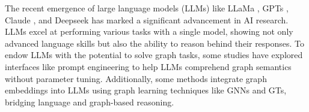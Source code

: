 The recent emergence of large language models (LLMs) like LLaMa \cite{touvron2023llama}, GPTs \cite{achiam2023gpt4}, Claude \cite{claude}, and Deepseek \cite{liu2024deepseek} has marked a significant advancement in AI research. LLMs excel at performing various tasks with a single model, showing not only advanced language skills but also the ability to reason behind their responses. To endow LLMs with the potential to solve graph tasks, some studies \cite{dai2024revisiting, zhang2024llm4dyg, kim2023kg, jiang2023structgpt, nlgraph, fatemi2023talk} have explored interfaces like prompt engineering to help LLMs comprehend graph semantics without parameter tuning. Additionally, some methods \cite{chen2024llaga, chai2023graphllm, tang2024graphgpt, perozzi2024let} integrate graph embeddings into LLMs using graph learning techniques like GNNs and GTs, bridging language and graph-based reasoning.
